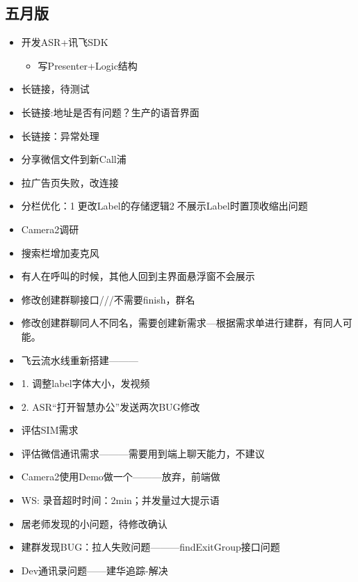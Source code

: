 \documentclass[12pt,a4paper]{ctexart}
\begin{document}
		\subsection{五月版}
	\begin{itemize}
		\item 开发ASR+讯飞SDK
		\begin{itemize}
			\item 写Presenter+Logic结构
		\end{itemize}
		\item 长链接，待测试
		\item 长链接:地址是否有问题？生产的语音界面
		\item 长链接：异常处理
		\item 分享微信文件到新Call浦
		\item 拉广告页失败，改连接
		\item 分栏优化：1⃣️更改Label的存储逻辑2⃣️不展示Label时置顶收缩出问题
		\item Camera2调研
		\item 搜索栏增加麦克风
		\item 有人在呼叫的时候，其他人回到主界面悬浮窗不会展示
		\item 修改创建群聊接口///不需要finish，群名
		\item 修改创建群聊同人不同名，需要创建新需求—根据需求单进行建群，有同人可能。
		\item 飞云流水线重新搭建———
		
		\item 1. 调整label字体大小，发视频
		\item 2. ASR“打开智慧办公”发送两次BUG修改
		\item 评估SIM需求
		\item 评估微信通讯需求———需要用到端上聊天能力，不建议
		\item Camera2使用Demo做一个———放弃，前端做
		\item WS: 录音超时时间：2min；并发量过大提示语
		\item 居老师发现的小问题，待修改确认
		\item 建群发现BUG：拉人失败问题———findExitGroup接口问题
		\item Dev通讯录问题——建华追踪-解决
		
	\end{itemize}

	\newpage
\end{document}
